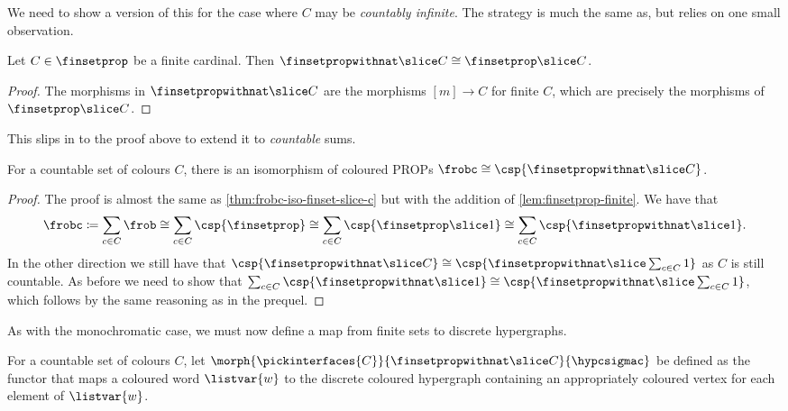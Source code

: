 We need to show a version of this for the case where \(C\) may be
\emph{countably infinite}.
The strategy is much the same as, but relies on one small observation.

\begin{lemma}
    \label{lem:finsetprop-finite}
    Let \(C \in \finsetprop\) be a finite cardinal.
    Then \(\finsetpropwithnat \slice C \cong \finsetprop \slice C\).
\end{lemma}
\begin{proof}
    The morphisms in \(\finsetpropwithnat \slice C\) are the morphisms
    \([m] \to C\) for finite \(C\), which are precisely the morphisms of
    \(\finsetprop \slice C\).
\end{proof}

This slips in to the proof above to extend it to \emph{countable} sums.

\begin{theorem}
    \label{thm:frobc-iso-hatfinset-slice-c}
    For a countable set of colours \(C\), there is an isomorphism of coloured
    PROPs \(\frobc \cong \csp{\finsetpropwithnat \slice C}\).
\end{theorem}
\begin{proof}
    The proof is almost the same as \cref{thm:frobc-iso-finset-slice-c} but with
    the addition of \cref{lem:finsetprop-finite}.
    We have that \[
        \frobc
        \coloneqq
        \sum_{c \in C}\frob
        \cong
        \sum_{c \in C}\csp{\finsetprop}
        \cong
        \sum_{c \in C}\csp{\finsetprop \slice 1}
        \cong
        \sum_{c \in C}\csp{\finsetpropwithnat \slice 1}.
    \]
    In the other direction we still have that \(
    \csp{\finsetpropwithnat \slice C}
    \cong
    \csp{\finsetpropwithnat \slice \sum_{c \in C} 1}
    \) as \(C\) is still countable.
    As before we need to show that \(
    \sum_{c \in C}\csp{\finsetpropwithnat \slice 1}
    \cong
    \csp{\finsetpropwithnat \slice \sum_{c \in C} 1}
    \), which follows by the same reasoning as in the prequel.
\end{proof}

As with the monochromatic case, we must now define a map from finite sets to
discrete hypergraphs.

\begin{definition}
    For a countable set of colours \(C\), let
    \(\morph{\pickinterfaces{C}}{\finsetpropwithnat \slice C}{\hypcsigmac}\) be
    defined as the functor that maps a coloured word \(\listvar{w}\) to the
    discrete coloured hypergraph containing an appropriately coloured vertex for
    each element of \(\listvar{w}\).
\end{definition}

